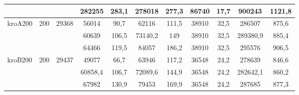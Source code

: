 \begin{adjustwidth}{-1in}{-1in}
\begin{center}
\begin{tabular}{lcccccccccc}
 & &  & 282255 & 283,1  & 278018 & 277,3  & 86740 & 17,7  & 900243 & 1121,8 \\
\midrule
\multirow{3}{*}{kroA200} & \multirow{3}{*}{200} & \multirow{3}{*}{29368} & 56014 & 90,7  & 62116 & 111,5  & 38910 & 32,5  & 286507 & 875,6 \\
 & &  & 60639 & 106,5  & 73140,2 & 149  & 38910 & 32,5  & 289380,9 & 885,4 \\
 & &  & 64466 & 119,5  & 84057 & 186,2  & 38910 & 32,5  & 295576 & 906,5 \\
\midrule
\multirow{3}{*}{kroB200} & \multirow{3}{*}{200} & \multirow{3}{*}{29437} & 49077 & 66,7  & 63946 & 117,2  & 36548 & 24,2  & 278639 & 846,6 \\
 & &  & 60858,4 & 106,7  & 72089,6 & 144,9  & 36548 & 24,2  & 282642,1 & 860,2 \\
 & &  & 67982 & 130,9  & 79453 & 169,9  & 36548 & 24,2  & 287685 & 877,3 \\
\bottomrule

\end{tabular}


\begin{tabular}{lcccccccccc}


\end{tabular}
\end{center}
\end{adjustwidth}
